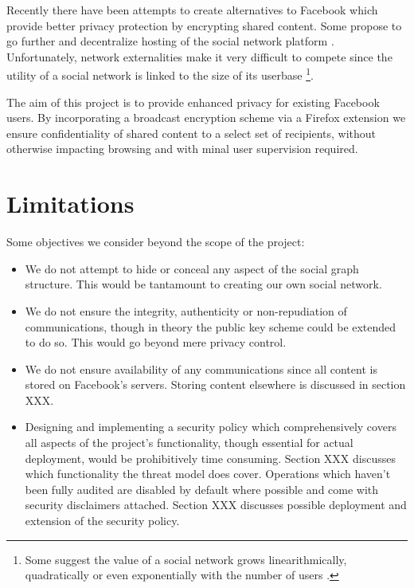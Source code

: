 Recently there have been attempts to create alternatives to Facebook \cite{pidder} which provide better privacy protection by encrypting shared content. Some propose to go further and decentralize hosting of the social network platform \cite{diaspora}. Unfortunately, network externalities make it very difficult to compete \cite{fb-network} since the utility of a social network is linked to the size of its userbase \footnote{Some suggest the value of a social network grows linearithmically, quadratically or even exponentially with the number of users \cite{metcalf}.}.

The aim of this project is to provide enhanced privacy for existing Facebook users. By incorporating a broadcast encryption scheme via a Firefox extension we ensure confidentiality of shared content to a select set of recipients, without otherwise impacting browsing and with minal user supervision required.

\section{Limitations}

Some objectives we consider beyond the scope of the project:

\begin{itemize}
    \item We do not attempt to hide or conceal any aspect of the social graph structure. This would be tantamount to creating our own social network.
    
    \item We do not ensure the integrity, authenticity or non-repudiation of communications, though in theory the public key scheme could be extended to do so. This would go beyond mere privacy control.
    
    \item We do not ensure availability of any communications since all content is stored on Facebook's servers. Storing content elsewhere is discussed in section XXX.
    
    \item Designing and implementing a security policy which comprehensively covers all aspects of the project's functionality, though essential for actual deployment, would be prohibitively time consuming. Section XXX discusses which functionality the threat model does cover. Operations which haven't been fully audited are disabled by default where possible and come with security disclaimers attached. Section XXX discusses possible deployment and extension of the security policy.
    
\end{itemize}


